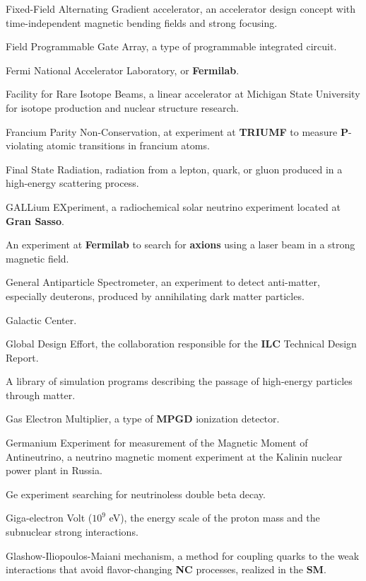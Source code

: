  Fixed-Field Alternating Gradient accelerator, an accelerator
design concept with time-independent magnetic bending fields and strong
focusing.

 Field Programmable Gate Array, a type of programmable 
integrated circuit.

 Fermi National Accelerator Laboratory, or {\bf
  Fermilab}.

  Facility for Rare Isotope Beams, a linear
accelerator
  at Michigan State University for isotope production and nuclear
 structure research.


   Francium Parity Non-Conservation, at experiment
 at {\bf TRIUMF} to measure {\bf P}-violating atomic transitions in 
 francium
     atoms. 

 Final State Radiation, radiation from a lepton, quark, or
gluon produced in a high-energy scattering process.

 GALLium EXperiment, a radiochemical solar neutrino
experiment located at {\bf Gran Sasso}.

  An experiment at {\bf Fermilab} to search 
for {\bf axions}  using a laser beam in a strong magnetic field.

  General Antiparticle Spectrometer, an experiment to detect
anti-matter, especially deuterons, produced by annihilating dark
matter particles.

  Galactic Center.

 Global Design Effort, the collaboration responsible for
the {\bf ILC} Technical Design Report.

  A library of simulation programs describing the 
passage of high-energy particles through matter.

 Gas Electron Multiplier, a type of {\bf MPGD} ionization
detector.

 Germanium Experiment for measurement of the Magnetic
Moment of Antineutrino,  a neutrino magnetic moment experiment at the
Kalinin nuclear power plant in Russia.

 Ge experiment searching for neutrinoless double
beta decay.

 Giga-electron Volt ($10^9$ eV), the energy scale of the proton
mass and the subnuclear strong interactions.

 Glashow-Iliopoulos-Maiani mechanism, a method for coupling
quarks to the weak interactions that avoid flavor-changing {\bf NC} processes,
realized in the {\bf SM}. 

